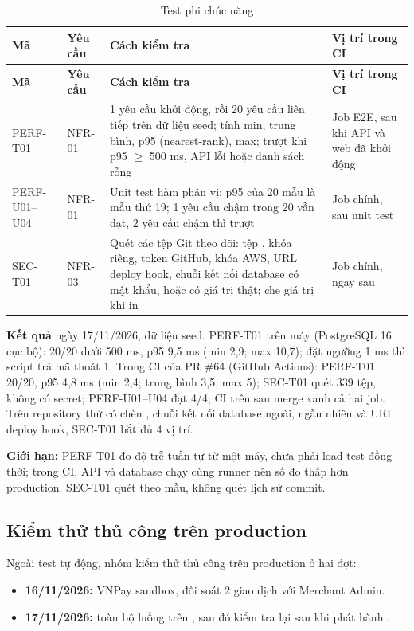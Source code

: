 {\small
\begin{longtable}{@{}L{1.9cm}L{1.3cm}L{7.6cm}L{3cm}@{}}
\caption{Test phi chức năng}\label{tab:nfrtest}\\
\toprule
\textbf{Mã} & \textbf{Yêu cầu} & \textbf{Cách kiểm tra} & \textbf{Vị trí trong CI} \\ \midrule \endfirsthead
\toprule \textbf{Mã} & \textbf{Yêu cầu} & \textbf{Cách kiểm tra} & \textbf{Vị trí trong CI} \\ \midrule \endhead
\bottomrule \endfoot
PERF-T01 & NFR-01 & 1 yêu cầu khởi động, rồi 20 yêu cầu  liên tiếp trên dữ liệu seed; tính min, trung bình, p95 (nearest-rank), max; trượt khi p95 $\ge$ 500 ms, API lỗi hoặc danh sách rỗng & Job E2E, sau khi API và web đã khởi động \\
PERF-U01--U04 & NFR-01 & Unit test hàm phân vị: p95 của 20 mẫu là mẫu thứ 19; 1 yêu cầu chậm trong 20 vẫn đạt, 2 yêu cầu chậm thì trượt & Job chính, sau unit test \\
SEC-T01 & NFR-03 & Quét các tệp Git theo dõi: tệp , khóa riêng, token GitHub, khóa AWS, URL deploy hook, chuỗi kết nối database có mật khẩu,  hoặc  có giá trị thật; che giá trị khi in & Job chính, ngay sau  \\
\end{longtable}}

\textbf{Kết quả} ngày 17/11/2026, dữ liệu seed. PERF-T01 trên máy (PostgreSQL 16 cục bộ): 20/20 dưới 500 ms, p95 9,5 ms (min 2,9; max 10,7); đặt ngưỡng 1 ms thì script trả mã thoát 1. Trong CI của PR \#64 (GitHub Actions): PERF-T01 20/20, p95 4,8 ms (min 2,4; trung bình 3,5; max 5); SEC-T01 quét 339 tệp, không có secret; PERF-U01--U04 đạt 4/4; CI trên  sau merge xanh cả hai job. Trên repository thử có chèn , chuỗi kết nối database ngoài,  ngẫu nhiên và URL deploy hook, SEC-T01 bắt đủ 4 vị trí.

\textbf{Giới hạn:} PERF-T01 đo độ trễ tuần tự từ một máy, chưa phải load test đồng thời; trong CI, API và database chạy cùng runner nên số đo thấp hơn production. SEC-T01 quét theo mẫu, không quét lịch sử commit.

\subsection{Kiểm thử thủ công trên production}
Ngoài test tự động, nhóm kiểm thử thủ công trên production ở hai đợt:
\begin{itemize}
\item \textbf{16/11/2026:} VNPay sandbox, đối soát 2 giao dịch với Merchant Admin.
\item \textbf{17/11/2026:} toàn bộ luồng trên , sau đó kiểm tra lại sau khi phát hành .
\end{itemize}

